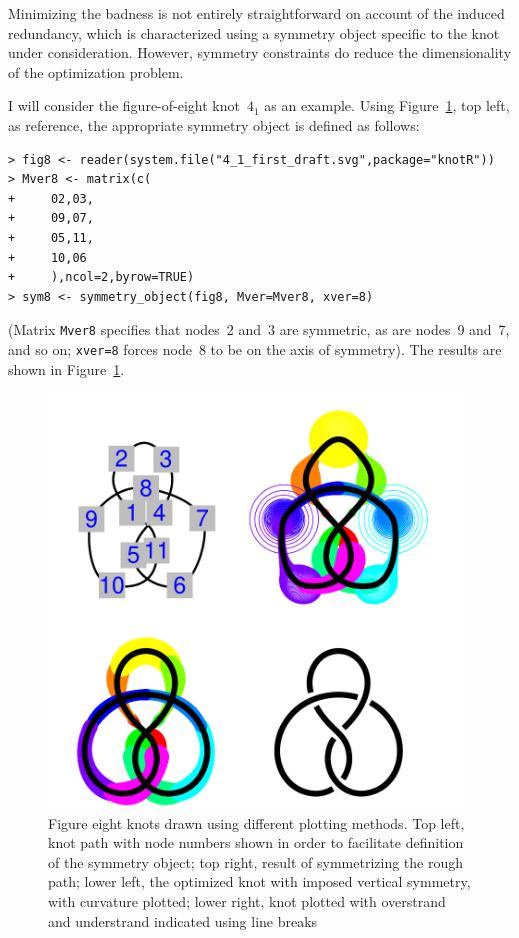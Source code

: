 \documentclass{birkjour}
\theoremstyle{definition}
\theoremstyle{remark}
\numberwithin{equation}{section}
\begin{document}
Minimizing the badness is not entirely straightforward on account of
the induced redundancy, which is characterized using a symmetry object
specific to the knot under consideration.  However, symmetry
constraints do reduce the dimensionality of the optimization problem.

I will consider the figure-of-eight knot~$4_1$ as an example.  Using
Figure~\ref{four_figure_8_knots}, top left, as reference, the
appropriate symmetry object is defined as follows:

\begin{verbatim}
> fig8 <- reader(system.file("4_1_first_draft.svg",package="knotR"))
> Mver8 <- matrix(c(
+     02,03,
+     09,07,
+     05,11,
+     10,06
+     ),ncol=2,byrow=TRUE)
> sym8 <- symmetry_object(fig8, Mver=Mver8, xver=8)
\end{verbatim}

(Matrix {\tt Mver8} specifies that nodes~2 and~3 are symmetric, as
are nodes~9 and~7, and so on; {\tt xver=8} forces node~8 to be on the
axis of symmetry).  The results are shown in
Figure~\ref{four_figure_8_knots}.

\begin{figure}[!tbp]
  \centering
\includegraphics[width=11cm]{knot-four_figure_eight_knots}
\caption{Figure eight knots drawn using different plotting methods.
  Top left, knot path with node numbers shown in order to facilitate
    \label{four_figure_8_knots} definition of the symmetry object; top
    right, result of symmetrizing the rough path; lower left, the
    optimized knot with imposed vertical symmetry, with curvature
    plotted; lower right, knot plotted with overstrand and understrand
    indicated using line breaks}
\end{figure}
\end{document}
